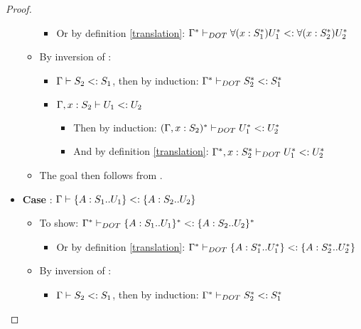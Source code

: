 \begin{proof}
\begin{itemize}
\begin{itemize}
            \begin{itemize}
                \item Or by definition \ref{translation}:
                    $\Gamma^{*} \vdash_{DOT} \forall(x:S_1^{*})U_1^{*} <: \forall(x:S_2^{*})U_2^{*}$
            \end{itemize}
            \item By inversion of :
            \begin{itemize}
                \item $\Gamma \vdash S_2 <: S_1$, then by induction:
                    $\Gamma^{*} \vdash_{DOT} S_2^{*} <: S_1^{*}$
                \item $\Gamma, x: S_2 \vdash U_1 <: U_2$
                \begin{itemize}
                    \item Then by induction: $(\Gamma, x: S_2)^{*} \vdash_{DOT} U_1^{*} <: U_2^{*}$
                    \item And by definition \ref{translation}:
                        $\Gamma^{*}, x:
                        S_2^{*} \vdash_{DOT} U_1^{*} <: U_2^{*}$
                \end{itemize}
            \end{itemize}
            \item The goal then follows from .
        \end{itemize}
        \item \textbf{Case} :
            $\Gamma \vdash \{A : S_1 .. U_1\} <: \{A : S_2 .. U_2\}$
        \begin{itemize}
            \item To show: $\Gamma^{*} \vdash_{DOT} \{A : S_1 .. U_1\}^{*} <: \{A : S_2 .. U_2\}^{*}$
            \begin{itemize}
                \item Or by definition \ref{translation}:
                    $\Gamma^{*} \vdash_{DOT} \{A : S_1^{*} .. U_1^{*}\} <: \{A : S_2^{*} .. U_2^{*}\}$
            \end{itemize}
            \item By inversion of :
            \begin{itemize}
                \item $\Gamma \vdash S_2 <: S_1$, then by induction:
                    $\Gamma^{*} \vdash_{DOT} S_2^{*} <: S_1^{*}$

\end{itemize}
\end{itemize}
\end{itemize}
\end{proof}
